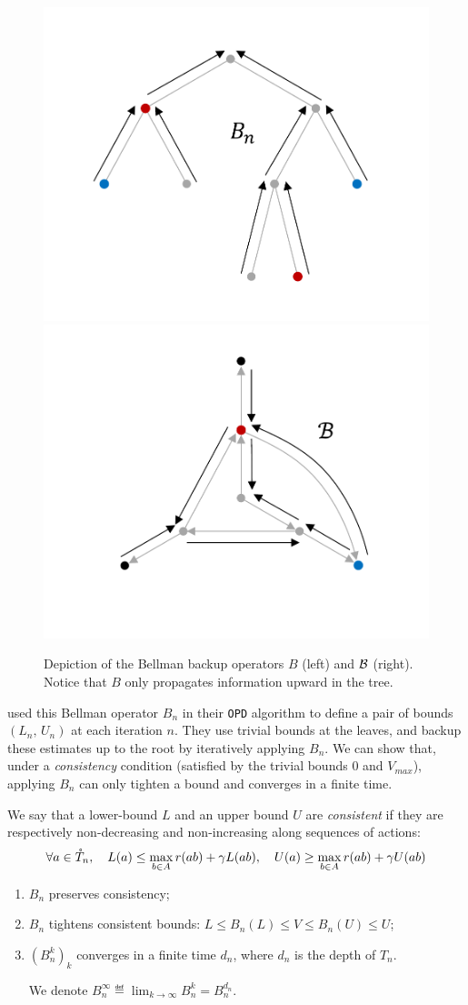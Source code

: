 \documentclass[runningheads]{llncs}
\begin{document}
\begin{figure}[tp]
	\centering
	\includegraphics[trim={1.8cm 1.4cm 1.9cm 1.9cm}, clip,width=0.42\linewidth]{img/tree_2}
	\hfill
	\includegraphics[trim={1.8cm 2.6cm 1.9cm 1.3cm}, clip,width=0.46\linewidth]{img/graph_2}
	\caption{Depiction of the Bellman backup operators $B$ (left) and $\mathcal{B}$ (right). Notice that $B$ only propagates information upward in the tree.}
	\label{fig:bellman}
\end{figure}

\citet{hren2008optimistic} used this Bellman operator $B_n$ in their \texttt{OPD} algorithm to define a pair of bounds $(L_n,\, U_n)$ at each iteration $n$. They use trivial bounds at the leaves, and backup these estimates up to the root by iteratively applying $B_n$. We can show that, under a \textit{consistency} condition (satisfied by the trivial bounds $0$ and $V_{max}$), applying $B_n$ can only tighten a bound and converges in a finite time.

\begin{definition}[Consistency]
	We say that a lower-bound $L$ and an upper bound $U$ are \emph{consistent} if they are respectively non-decreasing and non-increasing along sequences of actions:
	\begin{align*}
	\forall a\in\mathring{T}_n, \quad L(a) \leq \max_{b\in A} r(ab) + \gamma L(ab), \quad U(a) \geq \max_{b\in A} r(ab) + \gamma U(ab)
	\end{align*}
\end{definition}

\begin{lemma}[Properties of $B_n$]
	\begin{enumerate}[label=(\roman*)]
		\item $B_n$ preserves consistency;
		\item $B_n$ tightens consistent bounds: $
		L \leq B_n(L) \leq V \leq B_n(U) \leq U
		$;
		\item $(B_n^k)_k$ converges in a finite time $d_n$, where $d_n$ is the depth of $T_n$. 
		
		We denote $B_n^{\infty} \eqdef \lim_{k\rightarrow \infty} B_n^k = B_n^{d_n}$.
	\end{enumerate}
\end{lemma}
\end{document}
